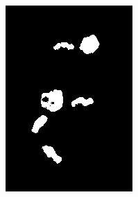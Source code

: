 \documentclass[a4paper]{article}
\begin{document}
\begin{figure}[H]
\begin{subfigure}[t]{0.3\linewidth}
        \end{subfigure}
%
        \begin{subfigure}[t]{0.3\linewidth}
            \includegraphics[width=\linewidth]{pictures/steps/pawns_mask.png}
        \end{subfigure}
%
        \begin{subfigure}[t]{0.3\linewidth}

\end{subfigure}
\end{figure}
\end{document}

